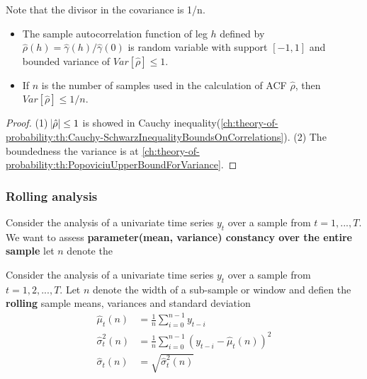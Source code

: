 \begin{remark}
	Note that the divisor in the covariance is 1/n.
\end{remark}


\begin{lemma}\label{ch:time-series-analysis:th:BoundedVarianceOfSampleAutocorrelationFunction}\hfill
\begin{itemize}
	\item The sample autocorrelation function of leg $h$ defined by $\hat{\rho}(h)=\hat{\gamma}(h)/\hat{\gamma}(0)$ is random variable with support $[-1,1]$ and bounded variance of $Var[\hat{\rho}] \leq 1$.
	\item If $n$ is the number of samples used in the calculation of ACF $\hat{\rho}$, then   $Var[\hat{\rho}] \leq 1/n$. 
\end{itemize}	
	
\end{lemma}
\begin{proof}
(1) $\abs{\hat{\rho}} \leq 1$ is showed in Cauchy inequality(\autoref{ch:theory-of-probability:th:Cauchy-SchwarzInequalityBoundsOnCorrelations}).
(2) The boundedness the variance is at
\autoref{ch:theory-of-probability:th:PopoviciuUpperBoundForVariance}.
\end{proof}


\subsubsection{Rolling analysis}

\begin{remark}
	Consider the analysis of a univariate time series $y_t$ over a sample from $t = 1,...,T$. We want to assess \textbf{parameter(mean, variance) constancy over the entire sample} let $n$ denote the 	
\end{remark}

\begin{definition}
	Consider the analysis of a univariate time series $y_t$ over a sample from $t=1,2,...,T$. Let $n$ denote the width of a sub-sample or window and defien the \textbf{rolling} sample means, variances and standard deviation 
	\begin{align*}
	\hat{\mu}_t(n) &=\frac{1}{n}\sum_{i=0}^{n-1} y_{t-i}\\
	\hat{\sigma}^2_t(n) &=\frac{1}{n}\sum_{i=0}^{n-1} (y_{t-i} - \hat{\mu}_t(n))^2\\
	\hat{\sigma}_t(n) &=\sqrt{\hat{\sigma}^2_t(n)}
	\end{align*}	
\end{definition}


